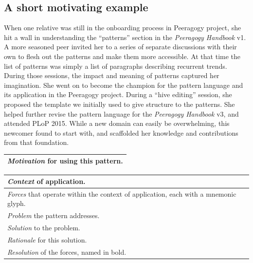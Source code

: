 \begin{refsection}
\subsection*{A short motivating example}
When one relative  was still in the onboarding
process in Peeragogy project, she hit a wall in understanding the
``patterns'' section in the \emph{Peeragogy Handbook} v1.  A more
seasoned peer invited her to a series of separate discussions with
their own  to flesh out the patterns and make
them more accessible.  At that time the list of patterns was simply a
list of paragraphs describing recurrent trends.  During those
sessions, the impact and meaning of patterns captured her imagination.
She went on to become the champion for the pattern language and its
application in the Peeragogy project.  During a ``hive editing''
session, she proposed the template we initially used to give structure
to the patterns.  She helped further revise the pattern language for
the \emph{Peeragogy Handbook} v3, and attended PLoP 2015.  While a new
domain can easily be overwhelming, this newcomer found  to start with, and scaffolded her knowledge and
contributions from that foundation.

\begin{table}
{\centering
\vspace{-.65cm}
\begin{tabular}{|p{}|}
\hline
\emph{Motivation} for using this pattern.\\ \hline
\end{tabular}
\vspace{.1cm}

\begin{tabular}{|p{}|}
\hline
\emph{Context} of application.\\ \hline
\emph{Forces} that operate within the context of application, each with a mnemonic glyph. \\ \hline
\emph{Problem} the pattern addresses.\\ \hline
\emph{Solution} to the problem.\\ \hline
\emph{Rationale} for this solution.\\ \hline
\emph{Resolution} of the forces, named in bold.\\ \hline
\end{tabular}
\vspace{.1cm}


}
\end{table}
\end{refsection}
